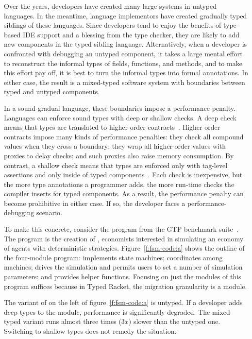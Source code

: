 
Over the years, developers have created many large systems in untyped languages.
In the meantime, language implementors have created gradually typed siblings of
these languages.  Since developers tend to enjoy the benefits of type-based IDE
support and a blessing from the type checker, they are likely to add new
components in the typed sibling language. Alternatively, when a developer is
confronted with debugging an untyped component, it takes a large mental effort
to reconstruct the informal types of fields, functions, and methods, and to make
this effort pay off, it is best to turn the informal types into formal
annotations. In either case, the result is a mixed-typed software system with
boundaries between typed and untyped components.

In a sound gradual language, these boundaries impose a performance penalty.  Languages can
enforce sound types with deep or shallow checks. A deep check means that types are
translated to higher-order contracts~\cite{ff-icfp-2002,tf-dls-2006,st-sfp-2006}.
Higher-order contracts impose many kinds of performance penalties: they check all
compound values when they cross a boundary; they wrap all higher-order values with
proxies to delay checks; and such proxies also raise memory consumption. By
contrast, a shallow check means that types are enforced only with tag-level
assertions and only inside of typed components~\cite{vss-popl-2017,
vksb-dls-2014}. Each check is inexpensive, but the more type annotations a
programmer adds, the more run-time checks the compiler inserts for typed
components. As a result, the performance penalty can become prohibitive in
either case. If so, the developer faces a performance-debugging scenario.

To make this concrete, consider the  program from the GTP benchmark
suite~\cite{gtnffvf-jfp-2019}. The program is the creation of \citet{fsm},
economists interested in simulating an economy of agents with deterministic
strategies. Figure~\ref{f:fsm-code:a} shows the outline of the four-module
program:  implements state machines;  coordinates among
machines;  drives the simulation and permits users to set a number of
simulation parameters; and  provides helper functions.  Focusing on
just the modules of this program suffices because in Typed Racket, the migration
granularity is a module.

The variant of  on the left of figure~\ref{f:fsm-code:a} is untyped.
If a developer adds deep types to the  module, performance is
significantly degraded. The mixed-typed variant runs almost three times
($3x$) slower than the untyped one.  Switching to shallow types does not remedy
the situation. 

